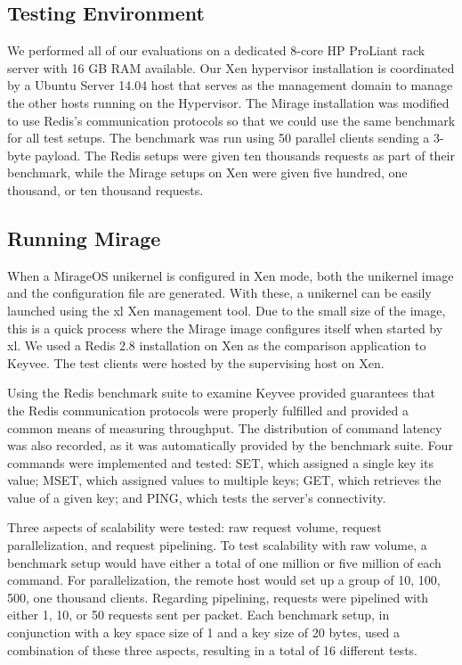 \documentclass[english,10pt,twocolumn]{article}
\begin{document}
\subsection{Testing Environment}
We performed all of our evaluations on a dedicated 8-core HP ProLiant rack server with 16 GB RAM available.
Our Xen hypervisor installation is coordinated by a Ubuntu Server 14.04 host that serves as the management domain to manage the other hosts running on the Hypervisor.
The Mirage installation was modified to use Redis's communication protocols so that we could use the same benchmark for all test setups. The benchmark was run using 50 parallel clients sending a 3-byte payload.
The Redis setups were given ten thousands requests as part of their benchmark, while the Mirage setups on Xen were given five hundred, one thousand, or ten thousand requests.

\subsection{Running Mirage}


When a MirageOS unikernel is configured in Xen mode, both the unikernel image and the configuration file are generated.
With these, a unikernel can be easily launched using the xl Xen management tool.
Due to the small size of the image, this is a quick process where the Mirage image configures itself when started by xl.
We used a Redis 2.8 installation on Xen as the comparison application to Keyvee.
The test clients were hosted by the supervising host on Xen.

Using the Redis benchmark suite to examine Keyvee provided guarantees that the Redis communication protocols were properly fulfilled and provided a common means of measuring throughput.
The distribution of command latency was also recorded, as it was automatically provided by the benchmark suite.
Four commands were implemented and tested: SET, which assigned a single key its value; MSET, which assigned values to multiple keys; GET, which retrieves the value of a given key; and PING, which tests the server's connectivity.

Three aspects of scalability were tested: raw request volume, request parallelization, and request pipelining.
To test scalability with raw volume, a benchmark setup would have either a total of one million or five million of each command.
For parallelization, the remote host would set up a group of 10, 100, 500, one thousand clients.
Regarding pipelining, requests were pipelined with either 1, 10, or 50 requests sent per packet.
Each benchmark setup, in conjunction with a key space size of 1 and a key size of 20 bytes, used a combination of these three aspects, resulting in a total of 16 different tests.
\end{document}
